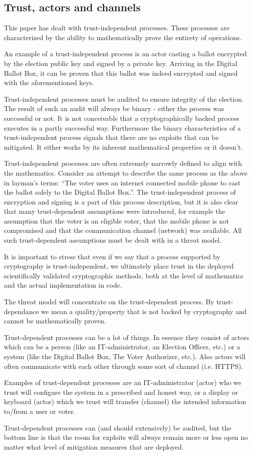 \subsection{Trust, actors and channels} 
This paper has dealt with trust-independent processes. These processes are characterized by the ability to mathematically prove the entirety of operations.

An example of a trust-independent process is an actor casting a ballot encrypted by the election public key and signed by a private key. Arriving in the Digital Ballot Box, it can be proven that this ballot was indeed encrypted and signed with the aforementioned keys.

Trust-independent processes must be audited to ensure integrity of the election. The result of such an audit will always be binary - either the process was successful or not. It is not conceivable that a cryptographically backed process executes in a partly successful way. Furthermore the binary characteristics of a trust-independent process signals that there are no exploits that can be mitigated. It either works by its inherent mathematical properties or it doesn’t.

Trust-independent processes are often extremely narrowly defined to align with the mathematics. Consider an attempt to describe the same process as the above in layman’s terms: “The voter uses an internet connected mobile phone to cast the ballot safely to the Digital Ballot Box.”. The trust-independent process of encryption and signing is a part of this process description, but it is also clear that many trust-dependent assumptions were introduced, for example the assumption that the voter is an eligible voter, that the mobile phone is not compromised and that the communication channel (network) was available. All such trust-dependent assumptions must be dealt with in a threat model.

It is important to stress that even if we say that a process supported by cryptography is trust-independent, we ultimately place trust in the deployed scientifically validated cryptographic methods, both at the level of mathematics and the actual implementation in code.

The threat model will concentrate on the trust-dependent process. By trust-dependance we mean a quality/property that is not backed by cryptography and cannot be mathematically proven.

Trust-dependent processes can be a lot of things. In essence they consist of actors which can be a person (like an IT-administrator, an Election Officer, etc.) or a system (like the Digital Ballot Box, The Voter Authorizer, etc.). Also actors will often communicate with each other through some sort of channel (i.e. HTTPS).

Examples of trust-dependent processes are an IT-administrator (actor) who we trust will configure the system in a prescribed and honest way, or a display or keyboard (actor) which we trust will transfer (channel) the intended information to/from a user or voter.

Trust-dependent processes can (and should extensively) be audited, but the bottom line is that the room for exploits will always remain more or less open no matter what level of mitigation measures that are deployed.
